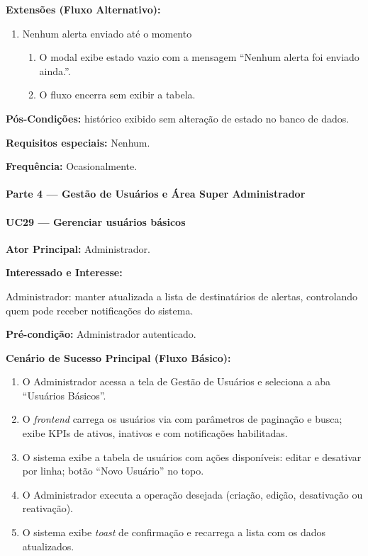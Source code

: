 \textbf{Extensões (Fluxo Alternativo):}

\begin{enumerate}
  \renewcommand{\theenumi}{3a}
  \renewcommand{\labelenumi}{\theenumi.}
  \item Nenhum alerta enviado até o momento
  \begin{enumerate}
  \item O modal exibe estado vazio com a mensagem
        ``Nenhum alerta foi enviado ainda.''.
  \item O fluxo encerra sem exibir a tabela.
  \end{enumerate}
\end{enumerate}

\textbf{Pós-Condições:} histórico exibido sem alteração de
estado no banco de dados.

\textbf{Requisitos especiais:} Nenhum.

\textbf{Frequência:} Ocasionalmente.

\paragraph{Parte 4 --- Gestão de Usuários e Área Super Administrador}\hfill\break

\paragraph{UC29 --- Gerenciar usuários básicos}\hfill\break

\textbf{Ator Principal:} Administrador.

\textbf{Interessado e Interesse:}

Administrador: manter atualizada a lista de destinatários
de alertas, controlando quem pode receber notificações do
sistema.

\textbf{Pré-condição:} Administrador autenticado.

\textbf{Cenário de Sucesso Principal (Fluxo Básico):}
\begin{enumerate}
  \item O Administrador acessa a tela de Gestão de
        Usuários e seleciona a aba ``Usuários Básicos''.
  \item O \textit{frontend} carrega os usuários via
         com parâmetros
        de paginação e busca; exibe KPIs de ativos,
        inativos e com notificações habilitadas.
  \item O sistema exibe a tabela de usuários com ações
        disponíveis: editar e desativar por linha; botão
        ``Novo Usuário'' no topo.
  \item O Administrador executa a operação desejada
        (criação, edição, desativação ou reativação).
  \item O sistema exibe \textit{toast} de confirmação
        e recarrega a lista com os dados atualizados.
\end{enumerate}

